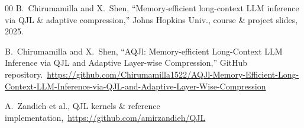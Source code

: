 \documentclass[conference]{IEEEtran}
\begin{document}
\begin{thebibliography}{00}
B.~Chirumamilla and X.~Shen, ``Memory-efficient long-context LLM inference via QJL \& adaptive compression,'' Johns Hopkins Univ., course \& project slides, 2025.

B.~Chirumamilla and X.~Shen, ``AQJl: Memory-efficient Long-Context LLM Inference via QJL and Adaptive Layer-wise Compression,'' GitHub repository.\ \url{https://github.com/Chirumamilla1522/AQJl-Memory-Efficient-Long-Context-LLM-Inference-via-QJL-and-Adaptive-Layer-Wise-Compression}

A.~Zandieh et al., QJL kernels \& reference implementation,\ \url{https://github.com/amirzandieh/QJL}

\end{thebibliography}
\vspace{12pt}
\end{document}
